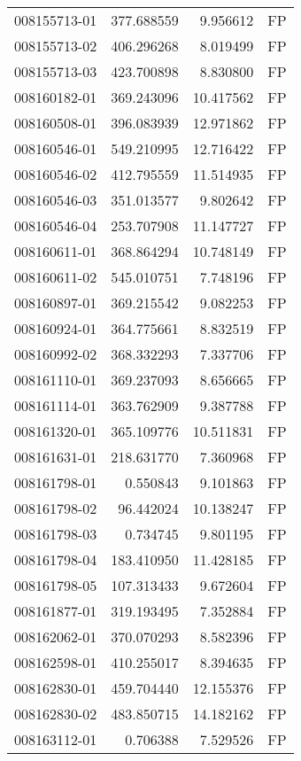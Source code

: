 \begin{tabular}{lrrl}
008155713-01 &  377.688559 &     9.956612 &   FP \\
008155713-02 &  406.296268 &     8.019499 &   FP \\
008155713-03 &  423.700898 &     8.830800 &   FP \\
008160182-01 &  369.243096 &    10.417562 &   FP \\
008160508-01 &  396.083939 &    12.971862 &   FP \\
008160546-01 &  549.210995 &    12.716422 &   FP \\
008160546-02 &  412.795559 &    11.514935 &   FP \\
008160546-03 &  351.013577 &     9.802642 &   FP \\
008160546-04 &  253.707908 &    11.147727 &   FP \\
008160611-01 &  368.864294 &    10.748149 &   FP \\
008160611-02 &  545.010751 &     7.748196 &   FP \\
008160897-01 &  369.215542 &     9.082253 &   FP \\
008160924-01 &  364.775661 &     8.832519 &   FP \\
008160992-02 &  368.332293 &     7.337706 &   FP \\
008161110-01 &  369.237093 &     8.656665 &   FP \\
008161114-01 &  363.762909 &     9.387788 &   FP \\
008161320-01 &  365.109776 &    10.511831 &   FP \\
008161631-01 &  218.631770 &     7.360968 &   FP \\
008161798-01 &    0.550843 &     9.101863 &   FP \\
008161798-02 &   96.442024 &    10.138247 &   FP \\
008161798-03 &    0.734745 &     9.801195 &   FP \\
008161798-04 &  183.410950 &    11.428185 &   FP \\
008161798-05 &  107.313433 &     9.672604 &   FP \\
008161877-01 &  319.193495 &     7.352884 &   FP \\
008162062-01 &  370.070293 &     8.582396 &   FP \\
008162598-01 &  410.255017 &     8.394635 &   FP \\
008162830-01 &  459.704440 &    12.155376 &   FP \\
008162830-02 &  483.850715 &    14.182162 &   FP \\
008163112-01 &    0.706388 &     7.529526 &   FP \\

\end{tabular}

